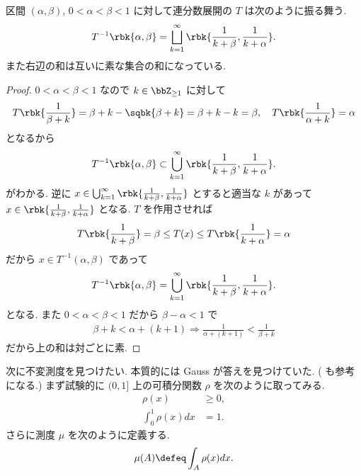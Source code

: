 \documentclass[openany, a4paper, oneside]{jsbook}
\begin{document}
\begin{lem}
区間 $(\alpha, \beta)$, $0 < \alpha < \beta < 1$ に対して連分数展開の $T$ は次のように振る舞う.
\begin{align}
 T^{-1} \rbk{\alpha, \beta}
 =
 \bigsqcup_{k=1}^{\infty} \rbk{\frac{1}{k + \beta}, \frac{1}{k + \alpha}}.
\end{align}
また右辺の和は互いに素な集合の和になっている.
\end{lem}
\begin{proof}
$0 < \alpha < \beta < 1$ なので $k \in \bbZ_{\geq 1}$ に対して
\begin{align}
 T \rbk{\frac{1}{\beta + k}}
 =
 \beta + k - \sqbk{\beta + k}
 =
 \beta + k - k
 =
 \beta, \quad
 T \rbk{\frac{1}{\alpha + k}}
 =
 \alpha
\end{align}
となるから
\begin{align}
 T^{-1} \rbk{\alpha, \beta}
 \subset
 \bigcup_{k=1}^{\infty} \rbk{\frac{1}{k + \beta}, \frac{1}{k + \alpha}}.
\end{align}
がわかる.
逆に $x \in \bigcup_{k=1}^{\infty} \rbk{\frac{1}{k + \beta}, \frac{1}{k + \alpha}}$ とすると適当な
$k$ があって $x \in \rbk{\frac{1}{k + \beta}, \frac{1}{k + \alpha}}$ となる.
$T$ を作用させれば
\begin{align}
 T \rbk{\frac{1}{k + \beta}}
 =
 \beta
 \leq
 T(x)
 \leq
 T \rbk{\frac{1}{k + \alpha}}
 =
 \alpha
\end{align}
だから $x \in T^{-1}(\alpha, \beta)$ であって
\begin{align}
 T^{-1} \rbk{\alpha, \beta}
 =
 \bigcup_{k=1}^{\infty} \rbk{\frac{1}{k + \beta}, \frac{1}{k + \alpha}}.
\end{align}
となる.
また $0 < \alpha < \beta < 1$ だから $\beta - \alpha < 1$ で
\begin{align}
 \beta + k < \alpha + (k + 1)
 \Rightarrow
 \frac{1}{\alpha + (k + 1)} < \frac{1}{\beta + k}
\end{align}
だから上の和は対ごとに素.
\end{proof}

次に不変測度を見つけたい.
本質的には Gauss が答えを見つけていた.
(\cite[Chapter8]{JornSteuding1} も参考になる.)
まず試験的に $(0, 1]$ 上の可積分関数 $\rho$ を次のように取ってみる.
\begin{align}
 \rho(x)
 &\geq
 0, \\
 \int_0^1 \rho(x) dx
 &= 1.
\end{align}
さらに測度 $\mu$ を次のように定義する.
\begin{align}
 \mu(A)
 \defeq
 \int_A \rho (x) dx.
\end{align}
\end{document}
